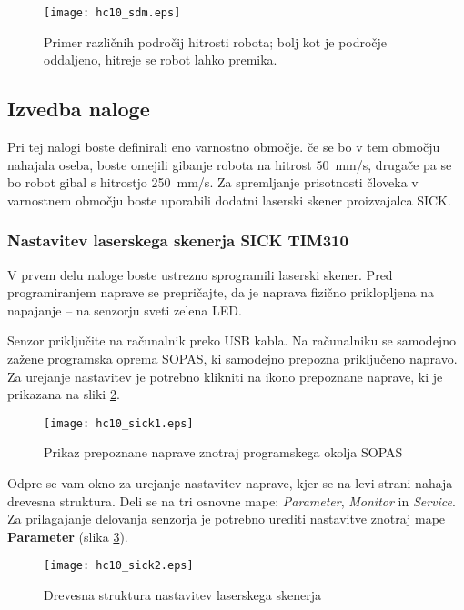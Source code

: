 \begin{figure}[!hbt]
	\centering
	\texttt{[image: hc10\_sdm.eps]}
	\caption{Primer različnih področij hitrosti robota; bolj kot je področje oddaljeno, hitreje se robot lahko premika.}
	\label{fig:hc10_sdm}
\end{figure}

\subsection*{Izvedba naloge}

Pri tej nalogi boste definirali eno varnostno območje. če se bo v tem območju nahajala oseba, boste omejili gibanje robota na hitrost 50~mm/s, drugače pa se bo robot gibal s hitrostjo 250~mm/s. Za spremljanje prisotnosti človeka v varnostnem območju boste uporabili dodatni laserski skener proizvajalca SICK.

\subsubsection*{Nastavitev laserskega skenerja SICK TIM310}

V prvem delu naloge boste ustrezno sprogramili laserski skener. Pred programiranjem naprave se prepričajte, da je naprava fizično priklopljena na napajanje -- na senzorju sveti zelena LED.

Senzor priključite na računalnik preko USB kabla. Na računalniku se samodejno zažene programska oprema SOPAS, ki samodejno prepozna priključeno napravo. Za urejanje nastavitev je potrebno klikniti na ikono prepoznane naprave, ki je prikazana na sliki \ref{fig:hc10_sick1}.

\begin{figure}[!hbt]
	\centering
	\texttt{[image: hc10\_sick1.eps]}
	\caption{Prikaz prepoznane naprave znotraj programskega okolja SOPAS}
	\label{fig:hc10_sick1}
\end{figure}

Odpre se vam okno za urejanje nastavitev naprave, kjer se na levi strani nahaja drevesna struktura. Deli se na tri osnovne mape: \emph{Parameter}, \emph{Monitor} in \emph{Service}. Za prilagajanje delovanja senzorja je potrebno urediti nastavitve znotraj mape \textbf{Parameter} (slika \ref{fig:hc10_sick2}).

\begin{figure}[!hbt]
	\centering
	\texttt{[image: hc10\_sick2.eps]}
	\caption{Drevesna struktura nastavitev laserskega skenerja}
	\label{fig:hc10_sick2}
\end{figure}

